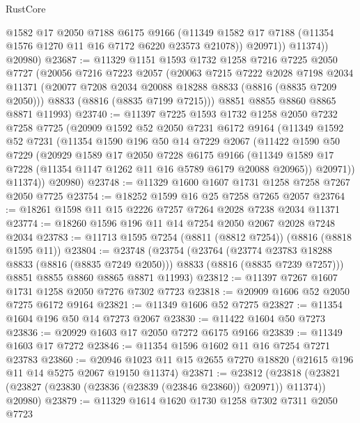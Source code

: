 \begin{lexlean}{RustCore}
\begin{coremodule}
              @1582
              @17
              @2050
              @7188
              @6175
              @9166
              (@11349 @1582 @17 @7188 (@11354 @1576 @1270 @11 @16 @7172 @6220 @23573 @21078))
              @20971))
          @11374))
      @20980)
@23687 := @11329
    @1151
    @1593
    @1732
    @1258
    @7216
    @7225
    @2050
    @7727
    (@20056
      @7216
      @7223
      @2057
      (@20063
        @7215
        @7222
        @2028
        @7198
        @2034
        @11371
        (@20077 @7208 @2034 @20088 @18288 @8833 (@8816 (@8835 @7209 @2050)))
        @8833
        (@8816 (@8835 @7199 @7215)))
      @8851
      @8855
      @8860
      @8865
      @8871
      @11993)
@23740 := @11397
    @7225
    @1593
    @1732
    @1258
    @2050
    @7232
    @7258
    @7725
    (@20909
      @1592
      @52
      @2050
      @7231
      @6172
      @9164
      (@11349
        @1592
        @52
        @7231
        (@11354
          @1590
          @196
          @50
          @14
          @7229
          @2067
          (@11422
            @1590
            @50
            @7229
            (@20929
              @1589
              @17
              @2050
              @7228
              @6175
              @9166
              (@11349 @1589 @17 @7228 (@11354 @1147 @1262 @11 @16 @5789 @6179 @20088 @20965))
              @20971))
          @11374))
      @20980)
@23748 := @11329 @1600 @1607 @1731 @1258 @7258 @7267 @2050 @7725
@23754 := @18252 @1599 @16 @25 @7258 @7265 @2057
@23764 := @18261 @1598 @11 @15 @2226 @7257 @7264 @2028 @7238 @2034 @11371
@23774 := @18260 @1596 @196 @11 @14 @7254 @2050 @2067 @2028 @7248 @2034
@23783 := @11713 @1595 @7254 (@8811 (@8812 @7254)) (@8816 (@8818 @1595 @11))
@23804 := @23748
    (@23754
      (@23764
        (@23774 @23783 @18288 @8833 (@8816 (@8835 @7249 @2050)))
        @8833
        (@8816 (@8835 @7239 @7257)))
      @8851
      @8855
      @8860
      @8865
      @8871
      @11993)
@23812 := @11397 @7267 @1607 @1731 @1258 @2050 @7276 @7302 @7723
@23818 := @20909 @1606 @52 @2050 @7275 @6172 @9164
@23821 := @11349 @1606 @52 @7275
@23827 := @11354 @1604 @196 @50 @14 @7273 @2067
@23830 := @11422 @1604 @50 @7273
@23836 := @20929 @1603 @17 @2050 @7272 @6175 @9166
@23839 := @11349 @1603 @17 @7272
@23846 := @11354 @1596 @1602 @11 @16 @7254 @7271 @23783
@23860 := @20946 @1023 @11 @15 @2655 @7270 @18820 (@21615 @196 @11 @14 @5275 @2067 @19150 @11374)
@23871 := @23812
    (@23818 (@23821 (@23827 (@23830 (@23836 (@23839 (@23846 @23860)) @20971)) @11374)) @20980)
@23879 := @11329 @1614 @1620 @1730 @1258 @7302 @7311 @2050 @7723

\end{coremodule}
\end{lexlean}
